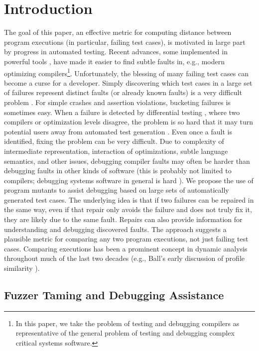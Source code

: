 \section{Introduction}

The goal of this paper, an effective metric for computing distance between program executions (in particular, failing test cases), is motivated in large part by progress in automated testing.  Recent advances, some implemented in powerful tools \cite{csmith,jsfunfuzz,ISSTA12,LangFuzz,ZhendongPLDI,ZhendongOOPSLA}, have made it easier to find subtle faults in, e.g., modern optimizing compilers\footnote{In this paper, we take the problem of testing and debugging compilers as representative of the general problem of testing and debugging complex critical systems software.}.  Unfortunately, the blessing of many failing test cases can become a curse for a developer.  Simply discovering which test cases in a large set of failures represent distinct faults (or already known faults) is a very difficult problem \cite{PLDI13,Podgurski04}.  For simple crashes and assertion violations, bucketing failures is sometimes easy.  When a failure is detected by differential testing \cite{Differential}, where two compilers or optimization levels disagree, the problem is so hard that it may turn potential users away from automated test generation \cite{PLDI13}.  Even once a fault is identified, fixing the problem can be very difficult.  Due to complexity of intermediate representation, interaction of optimizations, subtle language semantics, and other issues, debugging compiler faults may often be harder than debugging faults in other kinds of software (this is probably not limited to compilers; debugging systems software in general is hard \cite{mickens}).
We propose the use of program mutants \cite{mutant} to assist debugging based on large sets of automatically generated test cases.  The underlying idea is that if two failures can be repaired in the same way, even if that repair only avoids the failure and does not truly fix it, they are likely due to the same fault. Repairs can also provide  information for understanding and debugging discovered faults. The approach suggests a plausible metric for comparing any two program executions, not just failing test cases.  Comparing executions has been a prominent concept in dynamic analysis throughout much of the last two decades \cite{NearNeighbor,Sumner2011} (e.g., Ball's early discussion of profile similarity \cite{BallConcept}).

\subsection{Fuzzer Taming and Debugging Assistance}


